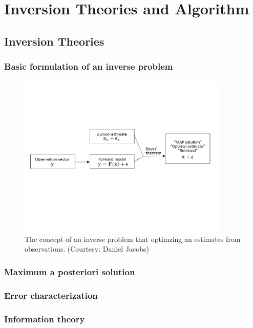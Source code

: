 \chapter{Inversion Theories and Algorithm} \label{ch:algorithm}

\section{Inversion Theories}
\subsection{Basic formulation of an inverse problem}

\begin{figure}[t]
  \centering
  \includegraphics[width={0.9\textwidth}]{figures/MAP.pdf}
  \caption{The concept of an inverse problem that optimzing an estimates from observations. (Courtesy: Daniel Jacobs)}
  \label{fig:inversion}
\end{figure}

\subsection{Maximum a posteriori solution}
\subsection{Error characterization}
\subsection{Information theory}

